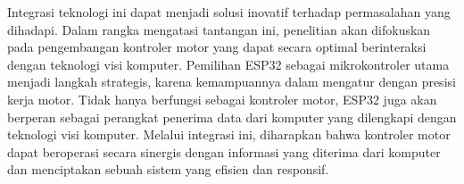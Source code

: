 Integrasi teknologi ini dapat menjadi solusi inovatif terhadap permasalahan yang dihadapi. Dalam rangka mengatasi tantangan ini, penelitian akan difokuskan pada pengembangan kontroler motor yang dapat secara optimal berinteraksi dengan teknologi visi komputer. Pemilihan ESP32 sebagai mikrokontroler utama menjadi langkah strategis, karena kemampuannya dalam mengatur dengan presisi kerja motor. Tidak hanya berfungsi sebagai kontroler motor, ESP32 juga akan berperan sebagai perangkat penerima data dari komputer yang dilengkapi dengan teknologi visi komputer. Melalui integrasi ini, diharapkan bahwa kontroler motor dapat beroperasi secara sinergis dengan informasi yang diterima dari komputer dan menciptakan sebuah sistem yang efisien dan responsif.

